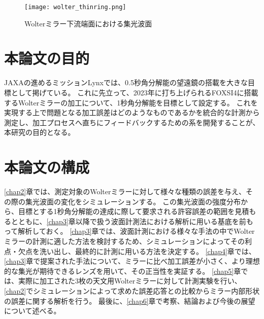 \begin{figure}[h!]
\centering
\texttt{[image: wolter\_thinring.png]}
\caption{Wolterミラー下流端面における集光波面}
\label{fig:wolter_thinring}
\end{figure}


\clearpage
\newpage
\section{本論文の目的}
\label{chap1_purpose}

JAXAの進めるミッションLynxでは、0.5秒角分解能の望遠鏡の搭載を大きな目標として掲げている。\cite{Gaskin2019}
これに先立って、2023年に打ち上げられるFOXSI4に搭載するWolterミラーの加工について、1秒角分解能を目標として設定する。
これを実現する上で問題となる加工誤差はどのようなものであるかを統合的な計測から測定し、加工プロセスへ直ちにフィードバックするための系を開発することが、本研究の目的となる。

\section{本論文の構成}
\label{chap1_outline}

\ref{chap2}章では、測定対象のWolterミラーに対して様々な種類の誤差を与え、その際の集光波面の変化をシミュレーションする。
この集光波面の強度分布から、目標とする1秒角分解能の達成に際して要求される許容誤差の範囲を見積もるとともに、\ref{chap3}章以降で扱う波面計測法における解析に用いる基底を前もって解析しておく。
\ref{chap3}章では、波面計測における様々な手法の中でWolterミラーの計測に適した方法を検討するため、シミュレーションによってその利点・欠点を洗い出し、最終的に計測に用いる方法を決定する。
\ref{chap4}章では、\ref{chap3}章で提案された手法について、ミラーに比べ加工誤差が小さく、より理想的な集光が期待できるレンズを用いて、その正当性を実証する。
\ref{chap5}章では、実際に加工された3枚の天文用Wolterミラーに対して計測実験を行い、\ref{chap2}でシミュレーションによって求めた誤差応答との比較からミラー内部形状の誤差に関する解析を行う。
最後に、\ref{chap6}章で考察、結論および今後の展望について述べる。

